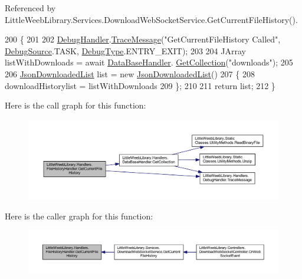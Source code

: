 Referenced by Little\+Weeb\+Library.\+Services.\+Download\+Web\+Socket\+Service.\+Get\+Current\+File\+History().


\begin{DoxyCode}
200         \{
201 
202             \mbox{\hyperlink{class_little_weeb_library_1_1_handlers_1_1_file_history_handler_afeb86d3ea5c145f7dd6937f061679395}{DebugHandler}}.\mbox{\hyperlink{interface_little_weeb_library_1_1_handlers_1_1_i_debug_handler_a2e405bc3492e683cd3702fae125221bc}{TraceMessage}}(\textcolor{stringliteral}{"GetCurrentFileHistory Called"}, 
      \mbox{\hyperlink{namespace_little_weeb_library_1_1_handlers_a2a6ca0775121c9c503d58aa254d292be}{DebugSource}}.TASK, \mbox{\hyperlink{namespace_little_weeb_library_1_1_handlers_ab66019ed40462876ec4e61bb3ccb0a62}{DebugType}}.ENTRY\_EXIT);
203 
204             JArray listWithDownloads = await \mbox{\hyperlink{class_little_weeb_library_1_1_handlers_1_1_file_history_handler_afe186c8ea770ecb9253a07f82f23c471}{DataBaseHandler}}.
      \mbox{\hyperlink{interface_little_weeb_library_1_1_handlers_1_1_i_data_base_handler_a33ee83202d229f44d3839af7c1b65df0}{GetCollection}}(\textcolor{stringliteral}{"downloads"});
205 
206             \mbox{\hyperlink{class_little_weeb_library_1_1_models_1_1_json_downloaded_list}{JsonDownloadedList}} list = \textcolor{keyword}{new} \mbox{\hyperlink{class_little_weeb_library_1_1_models_1_1_json_downloaded_list}{JsonDownloadedList}}()
207             \{
208                 downloadHistorylist = listWithDownloads
209             \};
210 
211             \textcolor{keywordflow}{return} list;
212         \}
\end{DoxyCode}
Here is the call graph for this function\+:\nopagebreak
\begin{figure}[H]
\begin{center}
\leavevmode
\includegraphics[width=350pt]{class_little_weeb_library_1_1_handlers_1_1_file_history_handler_a7e5a72e2cfdc3dfe97066cc7504b4445_cgraph}
\end{center}
\end{figure}
Here is the caller graph for this function\+:\nopagebreak
\begin{figure}[H]
\begin{center}
\leavevmode
\includegraphics[width=350pt]{class_little_weeb_library_1_1_handlers_1_1_file_history_handler_a7e5a72e2cfdc3dfe97066cc7504b4445_icgraph}
\end{center}
\end{figure}


